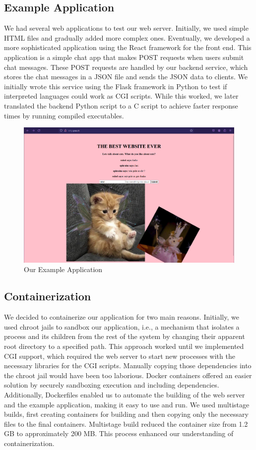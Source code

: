 \subsection*{Example Application}

We had several web applications to test our web server. Initially, we used simple HTML files and gradually added more complex ones. Eventually, we developed a more sophisticated application using the React framework for the front end. This application is a simple chat app that makes POST requests when users submit chat messages. These POST requests are handled by our backend service, which stores the chat messages in a JSON file and sends the JSON data to clients. We initially wrote this service using the Flask framework in Python to test if interpreted languages could work as CGI scripts. While this worked, we later translated the backend Python script to a C script to achieve faster response times by running compiled executables. 

\begin{figure}[h]
	\centering
	\includegraphics[width=\textwidth]{figures/screenshot_ex_app.png}
    \caption{Our Example Application}
\end{figure}

\subsection*{Containerization}
We decided to containerize our application for two main reasons. Initially, we used chroot jails to sandbox our application, i.e., a mechanism that isolates a process and its children from the rest of the system by changing their apparent root directory to a specified path. This approach worked until we implemented CGI support, which required the web server to start new processes with the necessary libraries for the CGI scripts. Manually copying those dependencies into the chroot jail would have been too laborious. Docker containers offered an easier solution by securely sandboxing execution and including dependencies. Additionally, Dockerfiles enabled us to automate the building of the web server and the example application, making it easy to use and run. We used multistage builds, first creating containers for building and then copying only the necessary files to the final containers. Multistage build reduced the container size from 1.2 GB to approximately 200 MB. This process enhanced our understanding of containerization.
